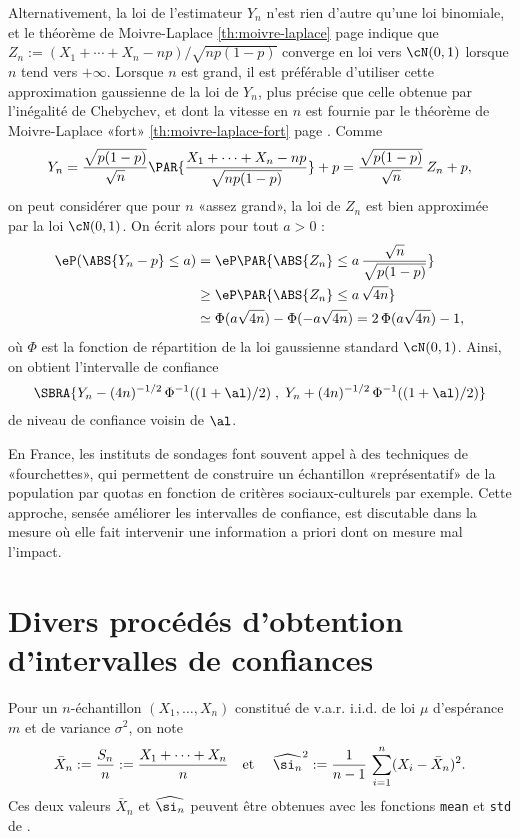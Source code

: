 Alternativement, la loi de l'estimateur $Y_n$ n'est rien d'autre qu'une loi
binomiale, et le théorème de Moivre-Laplace \ref{th:moivre-laplace} page
\pageref{th:moivre-laplace} indique que
$Z_n:=(X_1+\cdots+X_n-np)/\sqrt{np(1-p)}$ converge en loi vers $\cN(0,1)$
lorsque $n$ tend vers $+\infty$. Lorsque $n$ est grand, il est préférable
d'utiliser cette approximation gaussienne de la loi de $Y_n$, plus précise que
celle obtenue par l'inégalité de Chebychev, et dont la vitesse en $n$ est
fournie par le théorème de Moivre-Laplace «fort» \ref{th:moivre-laplace-fort}
page \pageref{th:moivre-laplace-fort}. Comme
$$
Y_n=\frac{\sqrt{p(1-p)}}{\sqrt{n}}\PAR{\frac{X_1+\cdots+X_n-np}{\sqrt{np(1-p)}}}+p
=\frac{\sqrt{p(1-p)}}{\sqrt{n}}\,Z_n+p,
$$
on peut considérer que pour $n$ «assez grand», la loi de $Z_n$ est bien
approximée par la loi $\cN(0,1)$. On écrit alors pour tout $a>0$ :
\begin{align*}
  \eP(\ABS{Y_n-p} \leq a) 
  &= \eP\PAR{\ABS{Z_n} \leq a\,\frac{\sqrt{n}}{\sqrt{p(1-p)}}}\\
  &\geq \eP\PAR{\ABS{Z_n} \leq a\,\sqrt{4n}} \\
  &\simeq \Phi(a\sqrt{4n})-\Phi(-a\sqrt{4n}) = 2\,\Phi(a\sqrt{4n})-1,
\end{align*}
où $\Phi$ est la fonction de répartition de la loi gaussienne standard
$\cN(0,1)$. Ainsi, on obtient l'intervalle de confiance
$$
\SBRA{Y_n-(4n)^{-1/2}\,\Phi^{-1}((1+\al)/2)\;,\;Y_n+(4n)^{-1/2}\,\Phi^{-1}((1+\al)/2)}
$$
de niveau de confiance voisin de $\al$.

\begin{rem}
  En France, les instituts de sondages font souvent appel à des techniques de
  «fourchettes», qui permettent de construire un échantillon «représentatif»
  de la population par quotas en fonction de critères sociaux-culturels par
  exemple.  Cette approche, sensée améliorer les intervalles de confiance, est
  discutable dans la mesure où elle fait intervenir une information a priori
  dont on mesure mal l'impact.
\end{rem}

%
\section{Divers procédés d'obtention d'intervalles de confiances}
%

Pour un $n$-échantillon $(X_1,\ldots,X_n)$ constitué de v.a.r. i.i.d. de loi
$\mu$ d'espérance $m$ et de variance $\sigma^2$, on note
$$
\bar{X}_n := \frac{S_n}{n}:=\frac{X_1+\cdots+X_n}{n} 
\text{\quad et \quad}
\widehat{\si_n}^2:=\frac{1}{n-1}\,\sum_{i=1}^n (X_i-\bar{X}_n)^2.
$$
Ces deux valeurs $\bar{X}_n$ et $\widehat{\si_n}$ peuvent être obtenues avec
les fonctions \texttt{mean} et \texttt{std} de \ML.

